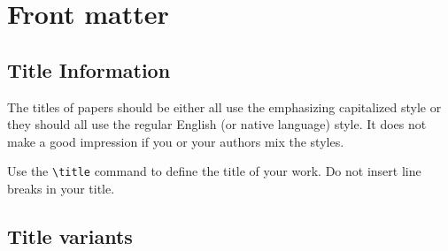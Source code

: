 \documentclass[
]{ceurart}
\begin{document}
\section{Front matter}

\subsection{Title Information}

The titles of papers should be either all use the emphasizing
capitalized style or they should all use the regular English (or
native language) style. It does not make a good impression if you or
your authors mix the styles.

Use the \verb|\title| command to define the title of your work. Do not
insert line breaks in your title.

\subsection{Title variants}




\end{document}
